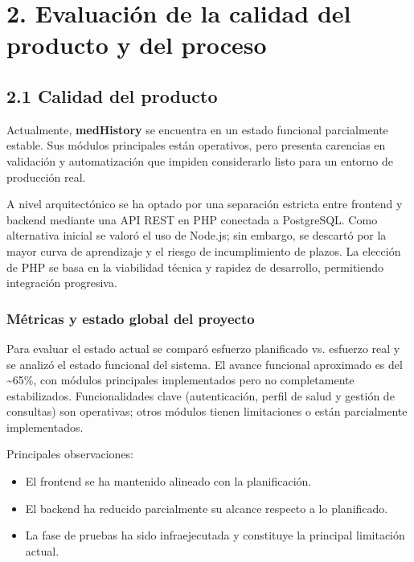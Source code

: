 \documentclass[a4paper,11pt]{article}
\author{Claudia Mateo \and Yousra Jebari}
\date{}
\begin{document}
\maketitle

\section*{2. Evaluación de la calidad del producto y del proceso}

\subsection*{2.1 Calidad del producto}

Actualmente, \textbf{medHistory} se encuentra en un estado funcional parcialmente estable. Sus módulos principales están operativos, pero presenta carencias en validación y automatización que impiden considerarlo listo para un entorno de producción real.

A nivel arquitectónico se ha optado por una separación estricta entre frontend y backend mediante una API REST en PHP conectada a PostgreSQL. Como alternativa inicial se valoró el uso de Node.js; sin embargo, se descartó por la mayor curva de aprendizaje y el riesgo de incumplimiento de plazos. La elección de PHP se basa en la viabilidad técnica y rapidez de desarrollo, permitiendo integración progresiva.

\subsubsection*{Métricas y estado global del proyecto}

Para evaluar el estado actual se comparó esfuerzo planificado vs. esfuerzo real y se analizó el estado funcional del sistema. El avance funcional aproximado es del \textasciitilde65\%, con módulos principales implementados pero no completamente estabilizados. Funcionalidades clave (autenticación, perfil de salud y gestión de consultas) son operativas; otros módulos tienen limitaciones o están parcialmente implementados.

Principales observaciones:
\begin{itemize}
	\item El frontend se ha mantenido alineado con la planificación.
	\item El backend ha reducido parcialmente su alcance respecto a lo planificado.
	\item La fase de pruebas ha sido infraejecutada y constituye la principal limitación actual.
\end{itemize}
\end{document}

